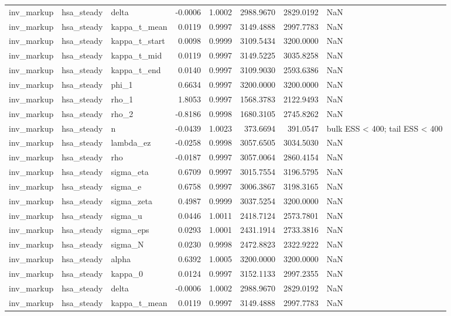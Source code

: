 \begin{tabular}{lllrrrrl}
inv\_markup & hsa\_steady & delta & -0.0006 & 1.0002 & 2988.9670 & 2829.0192 & NaN \\
inv\_markup & hsa\_steady & kappa\_t\_mean & 0.0119 & 0.9997 & 3149.4888 & 2997.7783 & NaN \\
inv\_markup & hsa\_steady & kappa\_t\_start & 0.0098 & 0.9999 & 3109.5434 & 3200.0000 & NaN \\
inv\_markup & hsa\_steady & kappa\_t\_mid & 0.0119 & 0.9997 & 3149.5225 & 3035.8258 & NaN \\
inv\_markup & hsa\_steady & kappa\_t\_end & 0.0140 & 0.9997 & 3109.9030 & 2593.6386 & NaN \\
inv\_markup & hsa\_steady & phi\_1 & 0.6634 & 0.9997 & 3200.0000 & 3200.0000 & NaN \\
inv\_markup & hsa\_steady & rho\_1 & 1.8053 & 0.9997 & 1568.3783 & 2122.9493 & NaN \\
inv\_markup & hsa\_steady & rho\_2 & -0.8186 & 0.9998 & 1680.3105 & 2745.8262 & NaN \\
inv\_markup & hsa\_steady & n & -0.0439 & 1.0023 & 373.6694 & 391.0547 & bulk ESS < 400; tail ESS < 400 \\
inv\_markup & hsa\_steady & lambda\_ez & -0.0258 & 0.9998 & 3057.6505 & 3034.5030 & NaN \\
inv\_markup & hsa\_steady & rho & -0.0187 & 0.9997 & 3057.0064 & 2860.4154 & NaN \\
inv\_markup & hsa\_steady & sigma\_eta & 0.6709 & 0.9997 & 3015.7554 & 3196.5795 & NaN \\
inv\_markup & hsa\_steady & sigma\_e & 0.6758 & 0.9997 & 3006.3867 & 3198.3165 & NaN \\
inv\_markup & hsa\_steady & sigma\_zeta & 0.4987 & 0.9999 & 3037.5254 & 3200.0000 & NaN \\
inv\_markup & hsa\_steady & sigma\_u & 0.0446 & 1.0011 & 2418.7124 & 2573.7801 & NaN \\
inv\_markup & hsa\_steady & sigma\_eps & 0.0293 & 1.0001 & 2431.1914 & 2733.3816 & NaN \\
inv\_markup & hsa\_steady & sigma\_N & 0.0230 & 0.9998 & 2472.8823 & 2322.9222 & NaN \\
inv\_markup & hsa\_steady & alpha & 0.6392 & 1.0005 & 3200.0000 & 3200.0000 & NaN \\
inv\_markup & hsa\_steady & kappa\_0 & 0.0124 & 0.9997 & 3152.1133 & 2997.2355 & NaN \\
inv\_markup & hsa\_steady & delta & -0.0006 & 1.0002 & 2988.9670 & 2829.0192 & NaN \\
inv\_markup & hsa\_steady & kappa\_t\_mean & 0.0119 & 0.9997 & 3149.4888 & 2997.7783 & NaN \\

\end{tabular}
